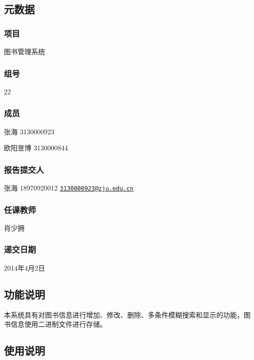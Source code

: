 \subsection*{元数据}

\subsubsection*{项目}

图书管理系统

\subsubsection*{组号}

22

\subsubsection*{成员}

张海 3130000923

欧阳昱博 3130000844

\subsubsection*{报告提交人}

张海 18970920012 \href{mailto:3130000923@zju.edu.cn}{\tt 3130000923@zju.\-edu.\-cn}

\subsubsection*{任课教师}

肖少拥

\subsubsection*{递交日期}

2014年4月2日

\subsection*{功能说明}

本系统具有对图书信息进行增加、修改、删除、多条件模糊搜索和显示的功能，图书信息使用二进制文件进行存储。

\subsection*{使用说明}

